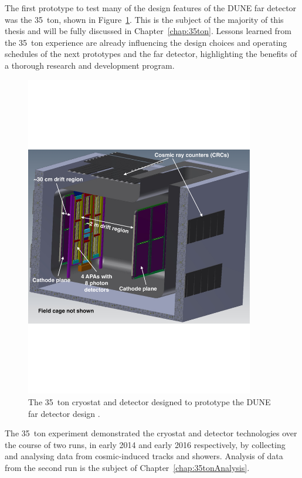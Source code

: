 The first prototype to test many of the design features of the DUNE far detector was the 35~ton, shown in Figure~\ref{fig:DUNE35ton}.  This is the subject of the majority of this thesis and will be fully discussed in Chapter~\ref{chap:35ton}.  Lessons learned from the 35~ton experience are already influencing the design choices and operating schedules of the next prototypes and the far detector, highlighting the benefits of a thorough research and development program.

\begin{figure}
  \centering
  \includegraphics[width=10cm]{35ton.pdf}
  \caption[The 35~ton cryostat and detector designed to prototype the DUNE far detector design.]{The 35~ton cryostat and detector designed to prototype the DUNE far detector design \cite{35tonPhaseINeutrino2014}.}
  \label{fig:DUNE35ton}
\end{figure}

The 35~ton experiment demonstrated the cryostat and detector technologies over the course of two runs, in early 2014 and early 2016 respectively, by collecting and analysing data from cosmic-induced tracks and showers.  Analysis of data from the second run is the subject of Chapter~\ref{chap:35tonAnalysis}.

